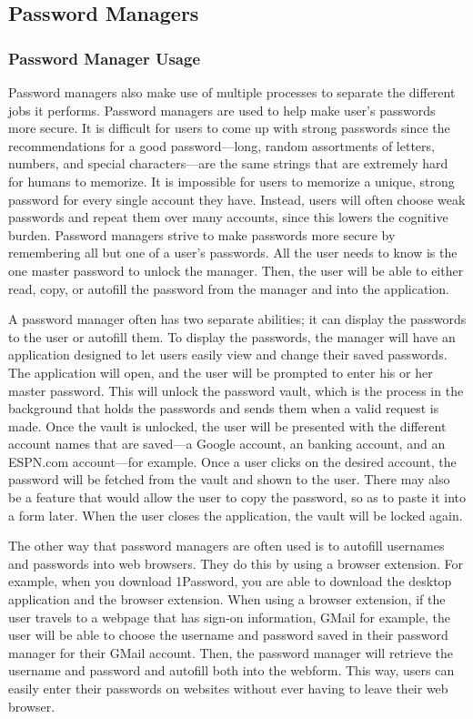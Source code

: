 \subsection{Password Managers}
\label{sec:passwordManagers}
\subsubsection{Password Manager Usage}
\label{sec:passwordManagerUsage}
Password managers also make use of multiple processes to separate the different jobs it performs.  Password managers are used to help make user's passwords more secure.  It is difficult for users to come up with strong passwords since the recommendations for a good password---long, random assortments of letters, numbers, and special characters---are the same strings that are extremely hard for humans to memorize.  It is impossible for users to memorize a unique, strong password for every single account they have.  Instead, users will often choose weak passwords and repeat them over many accounts, since this lowers the cognitive burden.  Password managers strive to make passwords more secure by remembering all but one of a user's passwords.  All the user needs to know is the one master password to unlock the manager.  Then, the user will be able to either read, copy, or autofill the password from the manager and into the application.

A password manager often has two separate abilities; it can display the passwords to the user or autofill them.  To display the passwords, the manager will have an application designed to let users easily view and change their saved passwords.  The application will open, and the user will be prompted to enter his or her master password.  This will unlock the password vault, which is the process in the background that holds the passwords and sends them when a valid request is made.  Once the vault is unlocked, the user will be presented with the different account names that are saved---a Google account, an banking account, and an ESPN.com account---for example.  Once a user clicks on the desired account, the password will be fetched from the vault and shown to the user.  There may also be a feature that would allow the user to copy the password, so as to paste it into a form later.  When the user closes the application, the vault will be locked again.

The other way that password managers are often used is to autofill usernames and passwords into web browsers.  They do this by using a browser extension.  For example, when you download 1Password, you are able to download the desktop application and the browser extension.  When using a browser extension, if the user travels to a webpage that has sign-on information, GMail for example, the user will be able to choose the username and password saved in their password manager for their GMail account.  Then, the password manager will retrieve the username and password and autofill both into the webform.  This way, users can easily enter their passwords on websites without ever having to leave their web browser.

